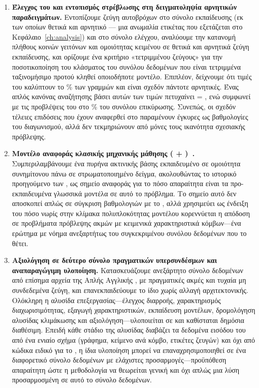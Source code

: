 \begin{enumerate}
    \item \textbf{Έλεγχος του  και εντοπισμός στρέβλωσης
    στη δειγματοληψία αρνητικών παραδειγμάτων.} Εντοπίζουμε
    \SelfLoopsTrain{} ζεύγη αυτοβρόχων στο σύνολο εκπαίδευσης (εκ των οποίων \SelfLoopsTrainPos{} θετικά
    και \SelfLoopsTrainNeg{} αρνητικό --- μια ανωμαλία ετικέτας που εξετάζεται στο
    Κεφάλαιο~\ref{ch:analysis}) και \SelfLoopsTest{} στο σύνολο ελέγχου, αναλύουμε την
    κατανομή πλήθους κοινών γειτόνων και ομοιότητας κειμένου σε θετικά και
    αρνητικά ζεύγη εκπαίδευσης, και ορίζουμε ένα κριτήριο «τετριμμένου ζεύγους»
    για την ποσοτικοποίηση του κλάσματος του συνόλου δεδομένων που είναι
    τετριμμένα ταξινομήσιμο προτού κληθεί οποιοδήποτε μοντέλο.
    Επιπλέον, δείχνουμε ότι \HubCount{} τιμές του \texttt{} καλύπτουν το
    \HubRowPct\% των γραμμών και είναι σχεδόν πάντοτε αρνητικές.
    Ένας απλός
    κανόνας αναζήτησης βάσει αυτών των τιμών πετυχαίνει  =
    \HubLookupFone{}, ενώ συμφωνεί με τις προβλέψεις του  στο
    \HubValAgreementPct\% του συνόλου επικύρωσης.
    Συνεπώς, οι σχεδόν τέλειες
    επιδόσεις που έχουν αναφερθεί στο  παραμένουν έγκυρες ως
    βαθμολογίες του διαγωνισμού, αλλά δεν τεκμηριώνουν από μόνες τους ικανότητα
    σχεσιακής πρόβλεψης.

    \item \textbf{Μοντέλο αναφοράς κλασικής μηχανικής μάθησης ( + )~\cite{cortes1995support}.}
    Συμπεριλαμβάνουμε ένα  πυρήνα ακτινικής βάσης εκπαιδευμένο σε
    ομοιότητα συνημίτονου  πάνω σε στρωματοποιημένο δείγμα,
    ακολουθώντας το ιστορικό προηγούμενο των \textcite{alhasan2006link}, ως σημείο αναφοράς για το πόσο απαραίτητα είναι τα
    προ-εκπαιδευμένα γλωσσικά μοντέλα σε αυτό το πρόβλημα.
    Το σημείο αυτό δεν αποσκοπεί απλώς σε σύγκριση βαθμολογιών με το
    , αλλά χρησιμεύει ως ένδειξη του πόσο νωρίς στην κλίμακα
    πολυπλοκότητας μοντέλου κορεννύεται η απόδοση σε προβλήματα πρόβλεψης
    ακμών με κειμενικά χαρακτηριστικά κόμβων---ένα ερώτημα με νόημα ανεξαρτήτως
    του συγκεκριμένου συνόλου δεδομένων που το θέτει.

    \item \textbf{Αξιολόγηση σε δεύτερο σύνολο πραγματικών υπερσυνδέσμων και
    αναπαραγώγιμη υλοποίηση.} Κατασκευάζουμε ανεξάρτητο σύνολο δεδομένων από
    επίσημα αρχεία  της Απλής Αγγλικής , με πραγματικές
    ακμές και τυχαία μη συνδεδεμένα ζεύγη, και επανεκπαιδεύουμε το ίδιο
     χωρίς αλλαγή αρχιτεκτονικής.
    Ολόκληρη η αλυσίδα επεξεργασίας---έλεγχος
    διαρροής, χαρακτηρισμός διαχωρισιμότητας, εξαγωγή χαρακτηριστικών,
    εκπαίδευση μοντέλων, δρομολόγηση αλυσίδας κλιμάκωσης και
    αξιολόγηση---υλοποιείται σε  και καθίσταται δημόσια διαθέσιμη.
    Επειδή κάθε στάδιο της αλυσίδας διαβάζει τα δεδομένα εισόδου του από ένα
    ενιαίο σχήμα (γράφημα, κείμενο ανά κόμβο, ετικέτες ζευγών) και όχι από
    κώδικα ειδικό για το , η ίδια υλοποίηση μπορεί να
    επαναχρησιμοποιηθεί σε ένα διαφορετικό σύνολο δεδομένων με ελάχιστες
    προσαρμογές---προϋπόθεση απαραίτητη ώστε η μεθοδολογία να θεωρείται γενική
    και όχι απλώς μια λύση προσαρμοσμένη σε αυτό το σύνολο δεδομένων.


\end{enumerate}
